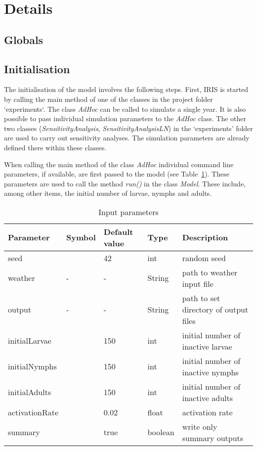 \documentclass[a4paper, 11pt]{scrartcl}
\begin{document}
\newpage
\section{Details}

\subsection{Globals}

\subsection{Initialisation}
The initialisation of the model involves the following steps. First, IRIS is started by calling the main method of one of the classes in the project folder `experiments`.
The class \textit{AdHoc} can be called to simulate a single year. It is also possible to pass individual simulation parameters to the \textit{AdHoc} class. The other two
classes (\textit{SensitivityAnalysis}, \textit{SensitivityAnalysisLN}) in the `experiments' folder are used to carry out sensitivity analyses. The simulation parameters are
already defined there within these classes.

When calling the main method of the class \textit{AdHoc} individual command line parameters, if available, are first passed to the model (see
Table~\ref{tab:initialisation_parameters}). These parameters are used to call the method \textit{run()} in the class \textit{Model}. These include, among other items, the initial
number of larvae, nymphs and adults.

\begin{table}[h!]
\caption{Input parameters}
\label{tab:initialisation_parameters}
\begin{tabularx}{\textwidth}{lllll}
\toprule
\textbf{Parameter} 	& \textbf{Symbol} & \textbf{Default value} & \textbf{Type} & \textbf{Description} \\
\midrule
seed    			&   & 42    & int     & random seed \\
weather     		& - & -     & String  & path to weather input file \\
output     			& - & -     & String  & path to set directory of output files \\
initialLarvae       &   & 150   & int     & initial number of inactive larvae \\
initialNymphs       &   & 150   & int     & initial number of inactive nymphs \\
initialAdults       &   & 150   & int     & initial number of inactive adults \\
activationRate      &   & 0.02  & float   & activation rate  \\
summary       		&   & true & boolean & write only summary outputs \\
\bottomrule
\end{tabularx}
\end{table}
\end{document}
